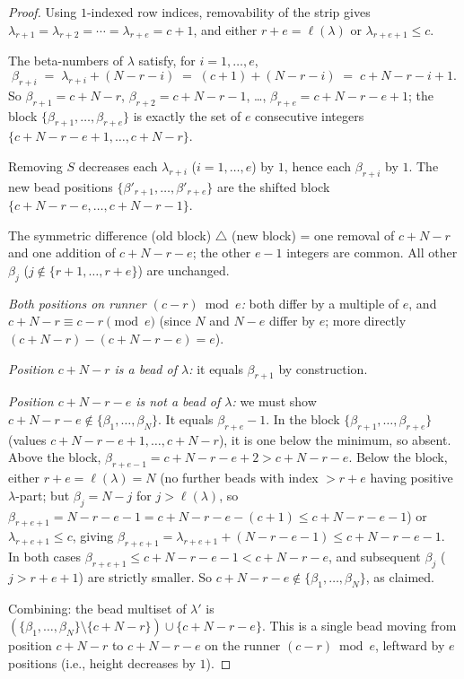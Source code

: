 \documentclass[11pt]{article}
\theoremstyle{definition}
\begin{document}
\begin{proof}
Using $1$-indexed row indices, removability of the strip gives
$\lambda_{r+1} = \lambda_{r+2} = \cdots = \lambda_{r+e} = c + 1$, and either
$r + e = \ell(\lambda)$ or $\lambda_{r+e+1} \le c$.

The beta-numbers of $\lambda$ satisfy, for $i = 1, \ldots, e$,
\[
    \beta_{r+i} \;=\; \lambda_{r+i} + (N - r - i) \;=\; (c + 1) + (N - r - i)
    \;=\; c + N - r - i + 1.
\]
So $\beta_{r+1} = c + N - r$, $\beta_{r+2} = c + N - r - 1$, \ldots,
$\beta_{r+e} = c + N - r - e + 1$; the block
$\{\beta_{r+1}, \ldots, \beta_{r+e}\}$ is exactly the set of $e$ consecutive
integers $\{c + N - r - e + 1, \ldots, c + N - r\}$.

Removing $S$ decreases each $\lambda_{r+i}$ ($i = 1, \ldots, e$) by $1$, hence
each $\beta_{r+i}$ by $1$. The new bead positions
$\{\beta'_{r+1}, \ldots, \beta'_{r+e}\}$
are the shifted block $\{c + N - r - e, \ldots, c + N - r - 1\}$.

The symmetric difference (old block) $\triangle$ (new block) = one removal
of $c + N - r$ and one addition of $c + N - r - e$; the other $e - 1$
integers are common. All other $\beta_j$ ($j \notin \{r+1, \ldots, r+e\}$)
are unchanged.

\emph{Both positions on runner $(c - r) \bmod e$:} both differ by a multiple
of $e$, and $c + N - r \equiv c - r \pmod{e}$ (since $N$ and $N - e$ differ by
$e$; more directly $(c + N - r) - (c + N - r - e) = e$).

\emph{Position $c + N - r$ is a bead of $\lambda$:} it equals $\beta_{r+1}$
by construction.

\emph{Position $c + N - r - e$ is not a bead of $\lambda$:} we must show
$c + N - r - e \notin \{\beta_1, \ldots, \beta_N\}$. It equals
$\beta_{r+e} - 1$. In the block $\{\beta_{r+1}, \ldots, \beta_{r+e}\}$ (values
$c + N - r - e + 1, \ldots, c + N - r$), it is one below the minimum, so
absent. Above the block, $\beta_{r+e-1} = c + N - r - e + 2 > c + N - r - e$.
Below the block, either $r + e = \ell(\lambda) = N$ (no further beads with
index $> r+e$ having positive $\lambda$-part; but $\beta_j = N - j$ for
$j > \ell(\lambda)$, so $\beta_{r+e+1} = N - r - e - 1 = c + N - r - e -
(c + 1) \le c + N - r - e - 1$) or $\lambda_{r+e+1} \le c$, giving
$\beta_{r+e+1} = \lambda_{r+e+1} + (N - r - e - 1) \le c + N - r - e - 1$.
In both cases $\beta_{r+e+1} \le c + N - r - e - 1 < c + N - r - e$, and
subsequent $\beta_j$ ($j > r + e + 1$) are strictly smaller. So $c + N - r - e
\notin \{\beta_1, \ldots, \beta_N\}$, as claimed.

Combining: the bead multiset of $\lambda'$ is $(\{\beta_1, \ldots, \beta_N\}
\setminus \{c+N-r\}) \cup \{c+N-r-e\}$. This is a single bead moving from
position $c + N - r$ to $c + N - r - e$ on the runner $(c-r) \bmod e$,
leftward by $e$ positions (i.e., height decreases by $1$).
\end{proof}
\end{document}
